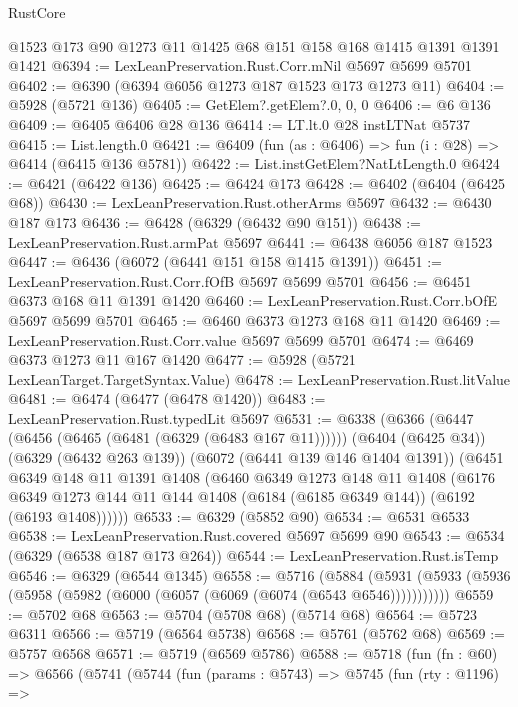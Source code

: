 \begin{lexlean}{RustCore}
\begin{coremodule}
    @1523
    @173
    @90
    @1273
    @11
    @1425
    @68
    @151
    @158
    @168
    @1415
    @1391
    @1391
    @1421
@6394 := LexLeanPreservation.Rust.Corr.mNil @5697 @5699 @5701
@6402 := @6390 (@6394 @6056 @1273 @187 @1523 @173 @1273 @11)
@6404 := @5928 (@5721 @136)
@6405 := GetElem?.getElem?.{0, 0, 0}
@6406 := @6 @136
@6409 := @6405 @6406 @28 @136
@6414 := LT.lt.{0} @28 instLTNat @5737
@6415 := List.length.{0}
@6421 := @6409 (fun (as : @6406) => fun (i : @28) => @6414 (@6415 @136 @5781))
@6422 := List.instGetElem?NatLtLength.{0}
@6424 := @6421 (@6422 @136)
@6425 := @6424 @173
@6428 := @6402 (@6404 (@6425 @68))
@6430 := LexLeanPreservation.Rust.otherArms @5697
@6432 := @6430 @187 @173
@6436 := @6428 (@6329 (@6432 @90 @151))
@6438 := LexLeanPreservation.Rust.armPat @5697
@6441 := @6438 @6056 @187 @1523
@6447 := @6436 (@6072 (@6441 @151 @158 @1415 @1391))
@6451 := LexLeanPreservation.Rust.Corr.fOfB @5697 @5699 @5701
@6456 := @6451 @6373 @168 @11 @1391 @1420
@6460 := LexLeanPreservation.Rust.Corr.bOfE @5697 @5699 @5701
@6465 := @6460 @6373 @1273 @168 @11 @1420
@6469 := LexLeanPreservation.Rust.Corr.value @5697 @5699 @5701
@6474 := @6469 @6373 @1273 @11 @167 @1420
@6477 := @5928 (@5721 LexLeanTarget.TargetSyntax.Value)
@6478 := LexLeanPreservation.Rust.litValue
@6481 := @6474 (@6477 (@6478 @1420))
@6483 := LexLeanPreservation.Rust.typedLit @5697
@6531 := @6338
    (@6366
      (@6447 (@6456 (@6465 (@6481 (@6329 (@6483 @167 @11))))))
      (@6404 (@6425 @34))
      (@6329 (@6432 @263 @139))
      (@6072 (@6441 @139 @146 @1404 @1391))
      (@6451
        @6349
        @148
        @11
        @1391
        @1408
        (@6460
          @6349
          @1273
          @148
          @11
          @1408
          (@6176
            @6349
            @1273
            @144
            @11
            @144
            @1408
            (@6184 (@6185 @6349 @144))
            (@6192 (@6193 @1408))))))
@6533 := @6329 (@5852 @90)
@6534 := @6531 @6533
@6538 := LexLeanPreservation.Rust.covered @5697 @5699 @90
@6543 := @6534 (@6329 (@6538 @187 @173 @264))
@6544 := LexLeanPreservation.Rust.isTemp
@6546 := @6329 (@6544 @1345)
@6558 := @5716
    (@5884 (@5931 (@5933 (@5936 (@5958 (@5982 (@6000 (@6057 (@6069 (@6074 (@6543 @6546)))))))))))
@6559 := @5702 @68
@6563 := @5704 (@5708 @68) (@5714 @68)
@6564 := @5723 @6311
@6566 := @5719 (@6564 @5738)
@6568 := @5761 (@5762 @68)
@6569 := @5757 @6568
@6571 := @5719 (@6569 @5786)
@6588 := @5718
    (fun (fn : @60) =>
    @6566
      (@5741
        (@5744
          (fun (params : @5743) =>
          @5745
            (fun (rty : @1196) =>

\end{coremodule}
\end{lexlean}
